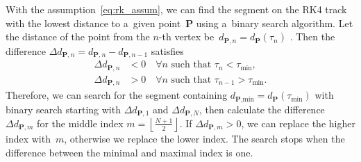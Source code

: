 		With the assumption~\ref{eq:rk_assum}, we can find the segment on the \ac{RK4} track with the lowest distance to a~given point~$\mathbf{P}$ using a~binary search algorithm. Let the distance of the point from the $n$\nobreakdash-th vertex %
		be~$d_{\mathbf{P},n} = d_{\mathbf{P}}(\tau_n)$%
		. Then the difference $\Delta d_{\mathbf{P},n} = d_{\mathbf{P},n}-d_{\mathbf{P},n-1}$ satisfies
			\begin{equation}
				\begin{aligned}
					\Delta d_{\mathbf{P},n} &< 0\quad \forall n \text{ such that } \tau_n < \tau_\text{min},\\
					\Delta d_{\mathbf{P},n} &> 0\quad \forall n \text{ such that } \tau_{n-1} > \tau_\text{min}.
				\end{aligned}
			\end{equation}
		Therefore, we can search for the segment containing $d_{\textbf{P},\text{min}} = d_{\mathbf{P}}(\tau_\text{min})$ with binary search starting with $\Delta d_{\mathbf{P},1}$ and $\Delta d_{\mathbf{P},N}$, then calculate the difference $\Delta d_{\mathbf{P},m}$ for the middle index $m = \left\lfloor\frac{N+1}{2}\right\rfloor$. If $\Delta d_{\mathbf{P},m} > 0$, we can replace the higher index with~$m$, otherwise we replace the lower index. The search stops when the difference between the minimal and maximal index is one.
		
